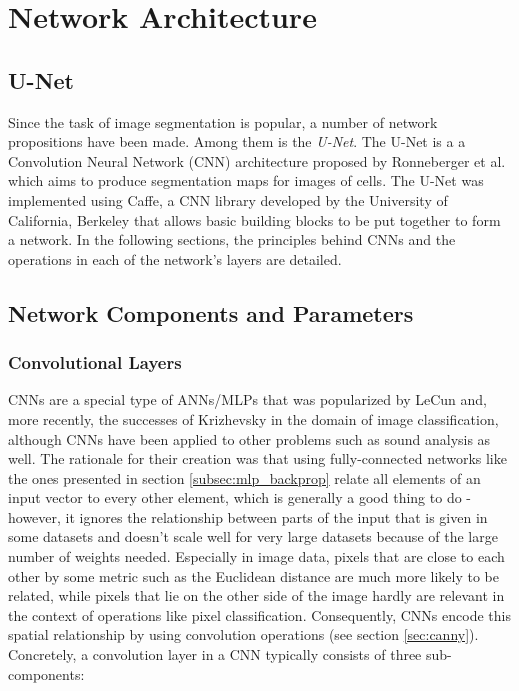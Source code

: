 \chapter {Network Architecture}


	\section {U-Net}
	Since the task of image segmentation is popular, a number of network propositions have been made. Among them is the \textit{U-Net}. The U-Net is a a Convolution Neural Network (CNN) architecture proposed by Ronneberger et al.\cite{unet} which aims to produce segmentation maps for images of cells. The U-Net was implemented using Caffe\cite{caffe}, a CNN library developed by the University of California, Berkeley that allows basic building blocks to be put together to form a network. In the following sections, the principles behind CNNs and the operations in each of the network's layers are detailed.


	\section {Network Components and Parameters}
	
		\subsection{Convolutional Layers}
CNNs are a special type of ANNs/MLPs that was popularized by LeCun \cite{lecun98} and, more recently, the successes of Krizhevsky \cite{krizhevsky2012} in the domain of image classification, although CNNs have been applied to other problems such as sound analysis as well. The rationale for their creation was that using fully-connected networks like the ones presented in section \ref{subsec:mlp_backprop} relate all elements of an input vector to every other element, which is generally a good thing to do - however, it ignores the relationship between parts of the input that is given in some datasets and doesn't scale well for very large datasets because of the large number of weights needed. Especially in image data, pixels that are close to each other by some metric such as the Euclidean distance are much more likely to be related, while pixels that lie on the other side of the image hardly are relevant in the context of operations like pixel classification. Consequently, CNNs encode this spatial relationship by using convolution operations (see section \ref{sec:canny}). Concretely, a convolution layer in a CNN typically consists of three sub-components:\\

